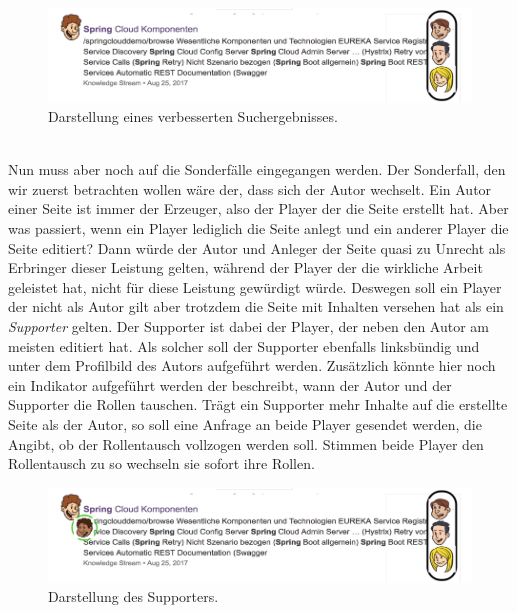 \documentclass[a4paper,12pt,twoside]{scrartcl}
\begin{document}
\\
\begin{figure}[h!]
\begin{center}
\includegraphics[scale = 0.5]{Bilder/NeueSuchErgebnisse.png}
\caption{Darstellung eines verbesserten Suchergebnisses.}
\label{NeueSuchErgebnisse}
\end{center}
\end{figure}
\\
Nun muss aber noch auf die Sonderfälle eingegangen werden. Der Sonderfall, den wir zuerst betrachten wollen wäre der, dass sich der Autor wechselt. Ein Autor einer Seite ist immer der Erzeuger, also der Player der die Seite erstellt hat. Aber was passiert, wenn ein Player lediglich die Seite anlegt und ein anderer Player die Seite editiert? Dann würde der Autor und Anleger der Seite quasi zu Unrecht als Erbringer dieser Leistung gelten, während der Player der die wirkliche Arbeit geleistet hat, nicht für diese Leistung gewürdigt würde. Deswegen soll ein Player der nicht als Autor gilt aber trotzdem die Seite mit Inhalten versehen hat als ein \textit{Supporter} gelten. Der Supporter ist dabei der Player, der neben den Autor am meisten editiert hat. Als solcher soll der Supporter ebenfalls linksbündig und unter dem Profilbild des Autors aufgeführt werden. Zusätzlich könnte hier noch ein Indikator aufgeführt werden der beschreibt, wann der Autor und der Supporter die Rollen tauschen. Trägt ein Supporter mehr Inhalte auf die erstellte Seite als der Autor, so soll eine Anfrage an beide Player gesendet werden, die Angibt, ob der Rollentausch vollzogen werden soll. Stimmen beide Player den Rollentausch zu so wechseln sie sofort ihre Rollen.
\\
\begin{figure}[h!]
\begin{center}
\includegraphics[scale = 0.5]{Bilder/NeueSuchErgebnisseSupporter.png}
\caption{Darstellung des Supporters.}
\label{NeueSuchErgebnisseSupporter}
\end{center}
\end{figure}
\end{document}
